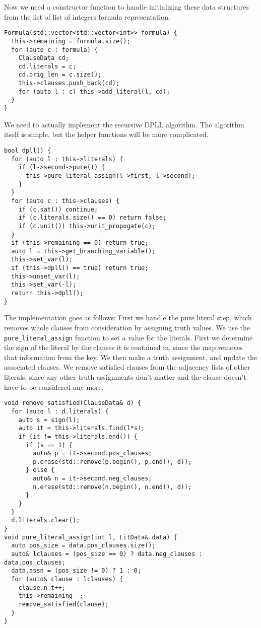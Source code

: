 \documentclass[10pt,AMS Euler]{article}
\begin{document}
Now we need a constructor function to handle initializing these data structures from the
list of list of integers formula representation.
\begin{verbatim}
Formula(std::vector<std::vector<int>> formula) {
  this->remaining = formula.size();
  for (auto c : formula) {
    ClauseData cd;
    cd.literals = c;
    cd.orig_len = c.size();
    this->clauses.push_back(cd);
    for (auto l : c) this->add_literal(l, cd);
  }
}
\end{verbatim}

We need to actually implement the recursive DPLL algorithm.
The algorithm itself is simple, but the helper functions will be more
complicated.
\begin{verbatim}
bool dpll() {
  for (auto l : this->literals) {
    if (l->second->pure()) {
      this->pure_literal_assign(l->first, l->second);
    }
  }
  for (auto c : this->clauses) {
    if (c.sat()) continue;
    if (c.literals.size() == 0) return false;
    if (c.unit()) this->unit_propogate(c);
  }
  if (this->remaining == 0) return true;
  auto l = this->get_branching_variable();
  this->set_var(l);
  if (this->dpll() == true) return true;
  this->unset_var(l);
  this->set_var(-l);
  return this->dpll();
}
\end{verbatim}
The implementation goes as follows:
First we handle the pure literal step, which removes whole clauses from
consideration by assigning truth values. We use the \texttt{pure\_literal\_assign}
function to set a value for the literals. First we determine the sign
of the literal by the clauses it is contained in, since the map removes
that information from the key. We then make a truth assignment, and 
update the associated clauses. We remove satisfied clauses from the
adjacency lists of other literals, since any other truth assignments
don't matter and the clause doesn't have to be considered any more.
\begin{verbatim}
void remove_satisfied(ClauseData& d) {
  for (auto l : d.literals) {
    auto s = sign(l);
    auto it = this->literals.find(l*s);
    if (it != this->literals.end()) {
      if (s == 1) {
        auto& p = it->second.pos_clauses;
        p.erase(std::remove(p.begin(), p.end(), d));
      } else {
        auto& n = it->second.neg_clauses;
        n.erase(std::remove(n.begin(), n.end(), d));
      }
    }
  }
  d.literals.clear();
}
void pure_literal_assign(int l, LitData& data) {
  auto pos_size = data.pos_clauses.size();
  auto& lclauses = (pos_size == 0) ? data.neg_clauses : data.pos_clauses;
  data.assn = (pos_size != 0) ? 1 : 0;
  for (auto& clause : lclauses) {
    clause.n_t++;
    this->remaining--;
    remove_satisfied(clause);
  }
}
\end{verbatim}
\end{document}
